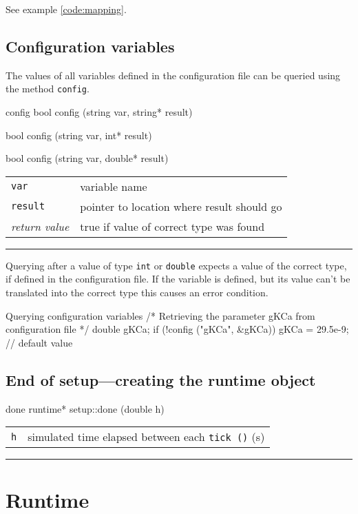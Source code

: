\documentclass[a4paper]{report}
\makeatletter
\newenvironment{parameters}%
{\begin{tabular}{@{\hspace{2em}}lp{0.6\textwidth}}}%
{\end{tabular}\par\vspace{1mm}\par\hrule\par\vspace{5mm}}
\makeatother
\begin{document}
See example \ref{code:mapping}.

\pagebreak
\subsection{Configuration variables}

The values of all variables defined in the configuration file can be
queried using the method \lstinline|config|.

\begin{head}{config}
  bool config (string var, string* result)

  bool config (string var, int* result)

  bool config (string var, double* result)
\end{head}
\begin{parameters}
  \lstinline|var|     & variable name \\
  \lstinline|result|  & pointer to location where result should go \\
  \emph{return value} & true if value of correct type was found \\
\end{parameters}

Querying after a value of type \lstinline|int| or \lstinline|double|
expects a value of the correct type, if defined in the configuration
file.  If the variable is defined, but its value can't be translated
into the correct type this causes an error condition.

\begin{code}{Querying configuration variables}
/* Retrieving the parameter gKCa
   from configuration file */
double gKCa;
if (!config ("gKCa", &gKCa))
  gKCa = 29.5e-9; // default value
\end{code}

\subsection{End of setup---creating the runtime object}

\begin{head}{done}
  runtime* setup::done (double h)
\end{head}
\begin{parameters}
  \lstinline|h| & simulated time elapsed between each \lstinline|tick ()| (s) \\
\end{parameters}

\section{Runtime}
\end{document}
